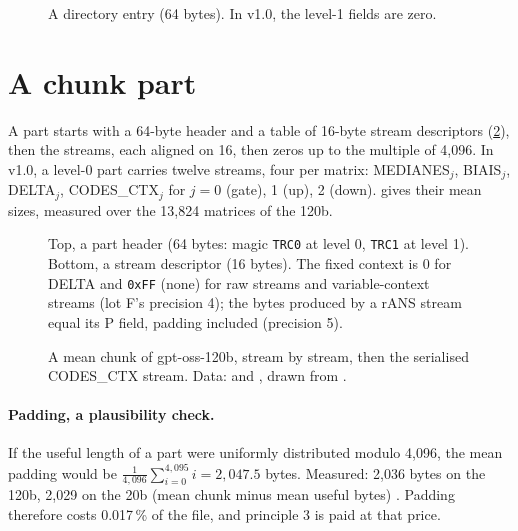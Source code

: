 \begin{figure}[ht]
\centering
\TdFmtRepertoire
\caption[A directory entry]{A directory entry (64 bytes). In v1.0, the level-1 fields are zero.}
\label{t2fmt:fig:repertoire}
\end{figure}

\section{A chunk part}\label{t2fmt:sec:partie}

A part starts with a 64-byte header and a table of 16-byte stream descriptors (\cref{t2fmt:fig:partie-entete}), then the streams, each aligned on 16, then zeros up to the multiple of 4{,}096. In v1.0, a level-0 part carries twelve streams, four per matrix: MEDIANES$_j$, BIAIS$_j$, DELTA$_j$, CODES\_CTX$_j$ for $j = 0$ (gate), 1 (up), 2 (down).  gives their mean sizes, measured over the 13{,}824 matrices of the 120b.

\begin{figure}[ht]
\centering
\TdFmtPartieEntete
\caption[A part header and a stream descriptor]{Top, a part header (64 bytes: magic \texttt{TRC0} at level 0, \texttt{TRC1} at level 1). Bottom, a stream descriptor (16 bytes). The fixed context is 0 for DELTA and \texttt{0xFF} (none) for raw streams and variable-context streams (lot F's precision 4); the bytes produced by a rANS stream equal its P field, padding included (precision 5).}
\label{t2fmt:fig:partie-entete}
\end{figure}

\begin{figure}[ht]
\centering
\TdFmtPartie
\caption[A mean chunk and a CODES\_CTX stream]{A mean chunk of gpt-oss-120b, stream by stream, then the serialised CODES\_CTX stream. Data:  and , drawn from .}
\label{t2fmt:fig:partie}
\end{figure}

\paragraph{Padding, a plausibility check.} If the useful length of a part were uniformly distributed modulo 4{,}096, the mean padding would be $\frac{1}{4{,}096}\sum_{i=0}^{4{,}095} i = 2{,}047.5$ bytes. Measured: 2{,}036 bytes on the 120b, 2{,}029 on the 20b (mean chunk minus mean useful bytes) \calc. Padding therefore costs 0.017\,\% of the file, and principle 3 is paid at that price.

